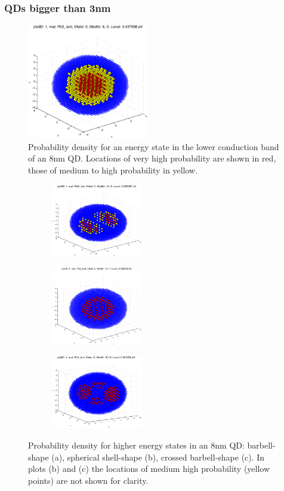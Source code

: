 \subsubsection{QDs bigger than 3nm} 
\begin{figure}
	\centering
	\includegraphics[width=200px]{Fig/Plots/r4CBMod6}
	\caption{Probability density for an energy state in the lower conduction band of an 8nm QD. Locations of very high probability are shown in red, those of medium to high probability in yellow.}
	\label{fig:sphericalWaveFn}
\end{figure}
%
\begin{figure}
	\centering
	\begin{subfigure}{150px}
		\includegraphics[width=150px]{Fig/Plots/r4CBmod10}
		\caption{}
	\end{subfigure}
	\begin{subfigure}{150px}
		\includegraphics[width=150px]{Fig/Plots/r4CBmod14}
		\caption{}
	\end{subfigure}
	\begin{subfigure}{150px}
		\includegraphics[width=150px]{Fig/Plots/r4CBmod20}
		\caption{}
	\end{subfigure}
	\caption{Probability density for higher energy states in an 8nm QD: barbell-shape (a), spherical shell-shape (b), crossed barbell-shape (c). In plots (b) and (c) the locations of medium high probability (yellow points) are not shown for clarity.}
	\label{fig:HigherModWaveFn}
\end{figure}
